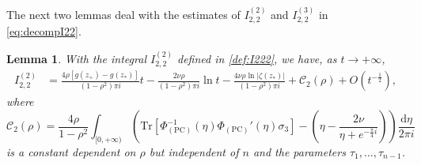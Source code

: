 \documentclass[11pt,a4paper]{article}
\newtheorem{lemma}[thm]{Lemma}
\numberwithin{equation}{section}
\begin{document}
The next two lemmas deal with the estimates of $I^{(2)}_{2,2}$ and $I^{(3)}_{2,2}$ in \eqref{eq:decompI22}.
\begin{lemma}\label{I-22-2}
With the integral $ I^{(2)}_{2,2}$ defined in \eqref{def:I222}, we have, as $t\to+\infty$,
\begin{align}\label{eq:estI222}
I^{(2)}_{2,2}&=\frac{4\rho[g(z_+)-g(z_*)]}{(1-\rho^2)\pi i}t-\frac{2\nu\rho}{(1-\rho^2)\pi i}\ln{t}-\frac{4\nu\rho\ln|\zeta(z_*)|}{(1-\rho^2)\pi i}+\mathcal{C}_2(\rho)+O\left(t^{-\frac{1}{2}}\right),
\end{align}
where
\begin{equation}\label{eq:c2}
\mathcal{C}_2(\rho)=\frac{4\rho }{1-\rho^2}\int_{[0,+\infty)}\left(\mathrm{Tr}\left[\Phi_{(\mathrm{PC})}^{-1}(\eta)
\Phi_{(\mathrm{PC})}'(\eta)\sigma_3\right]-\left(\eta-\frac{2\nu}{\eta+e^{-\frac{\pi}{4}i}}\right)\right)
\frac{\mathrm{d}\eta}{2\pi i}
\end{equation}
is a constant dependent on $\rho$ but   independent of $n$ and the parameters $\tau_1,\ldots,\tau_{n-1}$.
\end{lemma}
\end{document}
